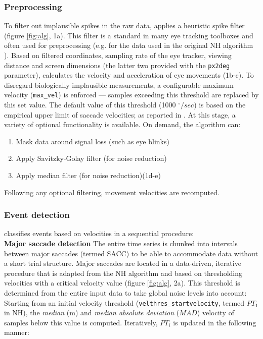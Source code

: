 \subsubsection*{Preprocessing}

 To filter out implausible spikes in the raw data, \remodnav applies a heuristic spike filter \citep{stampe1993} (figure \ref{fig:alg}, 1a). This filter is a standard in many eye tracking toolboxes and often used for preprocessing (e.g. for the data used in the original NH algorithm \citep{Friedman2018}). Based on filtered coordinates, sampling rate of the eye tracker, viewing distance and screen dimensions (the latter two provided with the \texttt{px2deg} parameter), \remodnav calculates the velocity and acceleration of eye movements (1b-c). To disregard biologically implausible measurements, a configurable maximum velocity (\texttt{max\_vel}) is enforced --- samples exceeding this threshold are replaced by this set value. The default value of this threshold (1000 $^\circ/sec$) is based on the empirical upper limit of saccade velocities; as reported in \cite{holmqvist2011eye}.
 At this stage, a variety of optional functionality is available. On demand, the algorithm can: 
 \begin{enumerate}
	\item Mask data around signal loss (such as eye blinks)
	\item Apply Savitzky-Golay filter (for noise reduction)
	\item Apply median filter (for noise reduction)(1d-e)
 \end{enumerate}
 Following any optional filtering, movement velocities are recomputed. \\

\subsubsection*{Event detection}
\remodnav classifies events based on velocities in a sequential procedure: \\
 \textbf{Major saccade detection} The entire time series is chunked into intervals between major saccades (termed SACC) to be able to accommodate data without a short trial structure. Major saccades are located in a data-driven, iterative procedure that is adapted from the NH algorithm and based on thresholding velocities with a critical velocity value (figure \ref{fig:alg}, 2a). This threshold is determined from the entire input data to take global noise levels into account: Starting from an initial velocity threshold (\texttt{velthres\_startvelocity}, termed $PT_1$ in NH), the \textit{median} (m) and \textit{median absolute deviation} ($MAD$) velocity of samples below this value is computed. Iteratively, $PT_i$ is updated in the following manner: 
 
